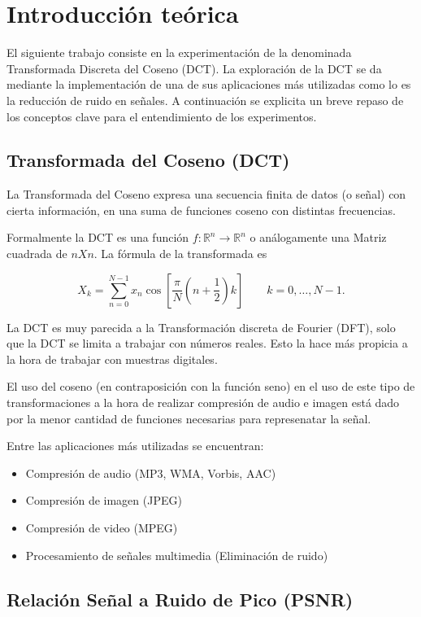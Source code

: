 \section{Introducci\'on te\'orica}

El siguiente trabajo consiste en la experimentaci\'on de la denominada 
Transformada Discreta del Coseno (DCT). La exploraci\'on de la DCT se da
mediante la implementaci\'on de una de sus aplicaciones m\'as utilizadas como lo
es la reducci\'on de ruido en se\~nales. A continuaci\'on se explicita
un breve repaso de los conceptos clave para el entendimiento de los
experimentos.

\subsection{Transformada del Coseno (DCT)}

La Transformada del Coseno expresa una secuencia finita de datos (o se\~nal) 
con cierta informaci\'on, en una suma de funciones coseno con distintas 
frecuencias.

Formalmente la DCT es una funci\'on $f:\mathbb{R}^n \to \mathbb{R}^n$ o an\'alogamente una
Matriz cuadrada de $n X n$. La f\'ormula de la transformada es

$$X_k = \sum_{n=0}^{N-1} x_n \cos \left[\frac{\pi}{N} \left(n+\frac{1}{2}\right) 
k \right] \quad \quad k = 0, \dots, N-1.$$ 

La DCT es muy parecida a la Transformaci\'on discreta de Fourier (DFT), solo que
la DCT se limita a trabajar con n\'umeros reales. Esto la hace m\'as propicia a
la hora de trabajar con muestras digitales.

El uso del coseno (en contraposici\'on con la funci\'on seno) en el uso de este
tipo de transformaciones a la hora de realizar compresi\'on de audio e imagen
est\'a dado por la menor cantidad de funciones necesarias para represenatar la se\~nal.

Entre las aplicaciones m\'as utilizadas se encuentran:

\begin{itemize}
\item Compresi\'on de audio (MP3, WMA, Vorbis, AAC)
\item Compresi\'on de imagen (JPEG)
\item Compresi\'on de video (MPEG)
\item Procesamiento de se\~nales multimedia (Eliminaci\'on de ruido)
\end{itemize}

\subsection {Relaci\'on Se\~nal a Ruido de Pico (PSNR)}

